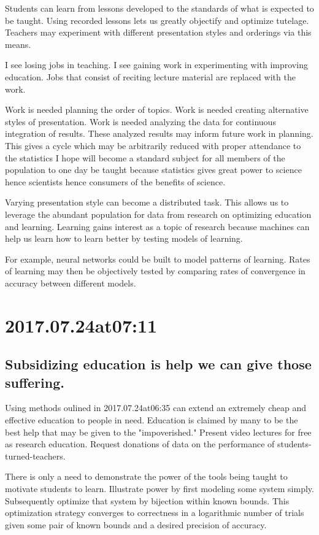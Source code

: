 Students can learn from lessons developed to the standards of what is expected to be taught. Using recorded lessons lets us greatly objectify and optimize tutelage. Teachers may experiment with different presentation styles and orderings via this means.

I see losing jobs in teaching. I see gaining work in experimenting with improving education. Jobs that consist of reciting lecture material are replaced with the work.

Work is needed planning the order of topics. Work is needed creating alternative styles of presentation. Work is needed analyzing the data for continuous integration of results. These analyzed results may inform future work in planning. This gives a cycle which may be arbitrarily reduced with proper attendance to the statistics I hope will become a standard subject for all members of the population to one day be taught because statistics gives great power to science hence scientists hence consumers of the benefits of science.

Varying presentation style can become a distributed task. This allows us to leverage the abundant population for data from research on optimizing education and learning. Learning gains interest as a topic of research because machines can help us learn how to learn better by testing models of learning.

For example, neural networks could be built to model patterns of learning. Rates of learning may then be objectively tested by comparing rates of convergence in accuracy between different models.

\section*{ 2017.07.24at07:11 }
\subsection*{ Subsidizing education is help we can give those suffering. }
Using methods oulined in 2017.07.24at06:35 can extend an extremely cheap and effective education to people in need. Education is claimed by many to be the best help that may be given to the "impoverished." Present video lectures for free as research education. Request donations of data on the performance of students-turned-teachers.

There is only a need to demonstrate the power of the tools being taught to motivate students to learn. Illustrate power by first modeling some system simply. Subsequently optimize that system by bijection within known bounds. This optimization strategy converges to correctness in a logarithmic number of trials given some pair of known bounds and a desired precision of accuracy.
